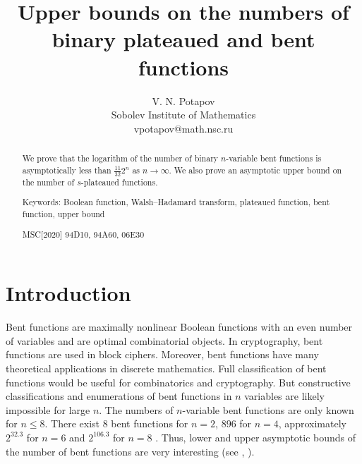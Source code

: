 \documentclass[a4paper,12pt]{article}   %
\begin{document}
\title{Upper bounds on the numbers of binary plateaued and bent
functions }

\author{ V. N. Potapov\\
 Sobolev Institute of Mathematics\\
{ vpotapov@math.nsc.ru}}


\maketitle

\begin{abstract}
We prove that the logarithm of the number of binary $n$-variable
bent functions is asymptotically  less than $\frac{11}{32}2^n$ as
$n\rightarrow\infty$. We also prove an asymptotic upper bound on the
number of $s$-plateaued functions.

Keywords: Boolean function, Walsh--Hadamard transform, plateaued
function, bent function, upper bound

 MSC[2020] 94D10, 94A60,  06E30
\end{abstract}




\section{Introduction}

Bent functions are maximally nonlinear Boolean functions with an
even number of variables and are optimal combinatorial objects. In
cryptography, bent functions are used in  block ciphers. Moreover,
bent functions have many theoretical applications  in discrete
mathematics. Full classification of bent functions would be
 useful for combinatorics and cryptography. But constructive
classifications and enumerations of bent functions in $n$ variables
are likely impossible for large $n$. The numbers of $n$-variable
bent functions are only known for $n\leq 8$. There exist  $8$ bent
functions  for $n=2$, $896$ for $n=4$, approximately $2^{32.3}$ for
$n=6$ and  $2^{106.3}$ for $n=8$ \cite{LL}. Thus, lower and upper
asymptotic bounds of the number of bent functions are very
interesting (see \cite[Chapter 4.4]{Mes0}, \cite[Chapter 13]{Tok0}).
\end{document}
